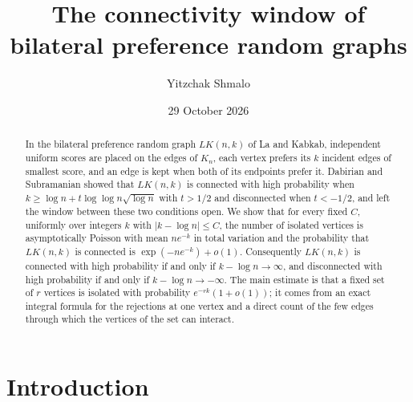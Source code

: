 \documentclass[11pt]{amsart}
\title[The connectivity window of bilateral preference graphs]{The connectivity window of bilateral preference random graphs}
\author{Yitzchak Shmalo}
\date{29 October 2026}
\theoremstyle{remark}
\numberwithin{equation}{section}
\newcommand{\1}{\mathbf 1}
\begin{document}
\begin{abstract}
In the bilateral preference random graph $LK(n,k)$ of La and Kabkab, independent uniform scores are placed on the edges of $K_n$, each vertex prefers its $k$ incident edges of smallest score, and an edge is kept when both of its endpoints prefer it. Dabirian and Subramanian showed that $LK(n,k)$ is connected with high probability when $k\ge\log n+t\log\log n\sqrt{\log n}$ with $t>1/2$ and disconnected when $t<-1/2$, and left the window between these two conditions open. We show that for every fixed $C$, uniformly over integers $k$ with $|k-\log n|\le C$, the number of isolated vertices is asymptotically Poisson with mean $ne^{-k}$ in total variation and the probability that $LK(n,k)$ is connected is $\exp(-ne^{-k})+o(1)$. Consequently $LK(n,k)$ is connected with high probability if and only if $k-\log n\to\infty$, and disconnected with high probability if and only if $k-\log n\to-\infty$. The main estimate is that a fixed set of $r$ vertices is isolated with probability $e^{-rk}(1+o(1))$; it comes from an exact integral formula for the rejections at one vertex and a direct count of the few edges through which the vertices of the set can interact.
\end{abstract}
\maketitle

\section{Introduction}\label{sec:intro}
\end{document}
